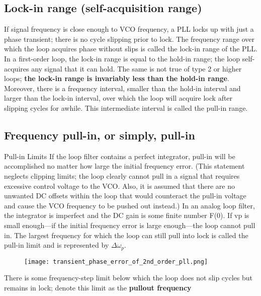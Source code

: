 \documentclass[a4paper]{article}
\begin{document}
\subsection{Lock-in range (self-acquisition range)}

If signal frequency is close enough to VCO frequency, a PLL locks up with
just a phase transient; there is no cycle slipping prior to lock. The frequency range over which the loop acquires phase without slips is called the lock-in range of the PLL. In a first-order loop, the lock-in range is equal to the hold-in range; the loop self-acquires any signal that it can hold. The same is not true of type 2 or higher loops; \textbf{the lock-in range is invariably less than the hold-in range}. Moreover, there is a frequency interval, smaller than the hold-in interval
and larger than the lock-in interval, over which the loop will acquire lock after slipping cycles for awhile. This intermediate interval is called the pull-in range.

\subsection{Frequency pull-in, or simply, pull-in}

Pull-in Limits If the loop filter contains a perfect integrator, pull-in will be accomplished no matter how large the initial frequency error. (This statement neglects clipping limits; the loop clearly cannot pull in a signal that requires excessive control voltage to the VCO. Also, it is assumed that there are no unwanted DC offsets within the loop that would counteract the pull-in voltage and cause the VCO frequency to be pushed out instead.) In an analog loop filter, the integrator is imperfect and the DC gain is some finite number F(0). If vp is small enough—if the initial frequency error is large enough—the loop cannot pull in. The largest frequency for which the loop can still pull into lock is called the pull-in limit and is represented by $\Delta\omega_p$.

\begin{figure}[h!]
	\centering
	\texttt{[image: transient\_phase\_error\_of\_2nd\_order\_pll.png]}
	\label{fig:transient_2nd_pll}
	\caption{\cite{Gardner}}
\end{figure}

There is some frequency-step limit below which the loop does not slip cycles but remains in lock; denote this limit as the \textbf{pullout frequency}
\end{document}
